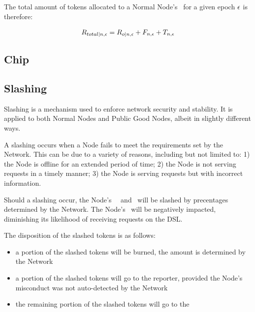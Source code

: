 The total amount of tokens allocated to a Normal Node's \operationPool\ for a given epoch $\epsilon$ is therefore:

\begin{equation}
    R_{total|n, \epsilon} =
    R_{o|n, \epsilon}
    + F_{n, \epsilon}
    + T_{n, \epsilon}
\end{equation}

\subsection{Chip}

\subsection{Slashing}

Slashing is a mechanism used to enforce network security and stability. It is applied to both Normal Nodes and Public Good Nodes, albeit in slightly different ways.

A slashing occurs when a Node fails to meet the requirements set by the Network. This can be due to a variety of reasons, including but not limited to: 1) the Node is offline for an extended period of time; 2) the Node is not serving requests in a timely manner; 3) the Node is serving requests but with incorrect information.

Should a slashing occur, the Node's \deposit\, \stakingPool\, and \networkReward\ will be slashed by precentages determined by the Network.
The Node's \reliabilityScore\ will be negatively impacted, diminishing its likelihood of receiving requests on the \gls{DSL}.

The disposition of the slashed tokens is as follows:
\begin{itemize}
    \item a portion of the slashed tokens will be burned, the amount is determined by the Network
    \item a portion of the slashed tokens will go to the reporter, provided the Node’s misconduct was not auto-detected by the Network
    \item the remaining portion of the slashed tokens will go to the \publicGoodPool
\end{itemize}

